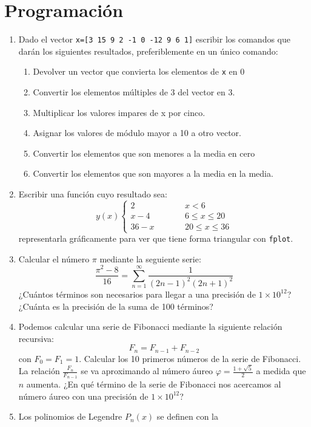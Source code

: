 \section{Programación}

\begin{enumerate}
\item Dado el vector \texttt{x={[}3 15 9 2 -1 0 -12 9 6 1{]}} escribir
  los comandos que darán los siguientes resultados, preferiblemente en
  un único comando:

  \begin{enumerate}
  \item Devolver un vector que convierta los elementos de \texttt{x}
    en 0
  \item Convertir los elementos múltiples de 3 del vector en 3.
  \item Multiplicar los valores impares de x por cinco.
  \item Asignar los valores de módulo mayor a 10 a otro vector.
  \item Convertir los elementos que son menores a la media en cero
  \item Convertir los elementos que son mayores a la media en la
    media.
  \end{enumerate}
\item Escribir una función cuyo resultado sea:
$$ y(x)\left\{
    \begin{array}{ccc}
      2 & \qquad & x<6\\
      x-4 & \qquad & 6\leq x\leq20\\
      36-x & \qquad & 20\leq x\leq36\end{array}\right.$$
 representarla
  gráficamente para ver que tiene forma triangular con \texttt{fplot}.
\item Calcular el número $\pi$ mediante la seguiente serie:
$$\frac{\pi^{2}-8}{16}=\sum_{n=1}^{\infty}\frac{1}{(2n-1)^{2}(2n+1)^{2}}$$
  ¿Cuántos términos son necesarios para llegar a una precisión de
  $1\times10^{12}$?  ¿Cuánta es la precisión de la suma de 100
  términos?
\item Podemos calcular una serie de Fibonacci mediante la siguiente
  relación recursiva:
$$ F_{n}=F_{n-1}+F_{n-2}$$
con $F_{0}=F_{1}=1$.
  Calcular los 10 primeros números de la serie de Fibonacci. La
  relación $\frac{F_{n}}{F_{n-1}}$ se va aproximando al número áureo
  $\varphi=\frac{1+\sqrt{5}}{2}$ a medida que $n$ aumenta. ¿En qué
  término de la serie de Fibonacci nos acercamos al número áureo con
  una precisión de $1\times10^{12}$?
\item Los polinomios de Legendre $P_{n}(x)$ se definen con la

\end{enumerate}
